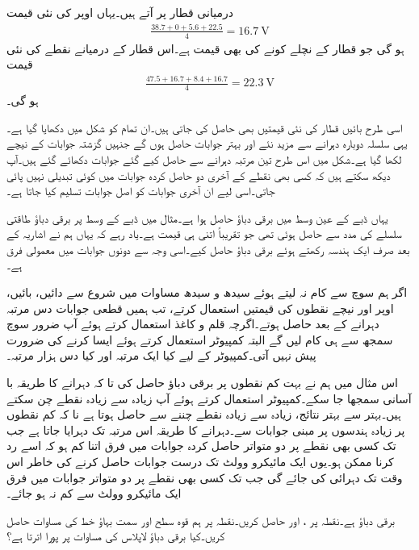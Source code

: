 درمیانی قطار پر آتے ہیں۔یہاں اوپر  کی نئی قیمت
\begin{align*}
\frac{38.7+0+5.6+22.5}{4}=\SI{16.7}{\volt}
\end{align*}
ہو گی جو قطار کے  نچلے کونے کی بھی قیمت ہے۔اس قطار کے درمیانے نقطے کی نئی قیمت
\begin{align*}
\frac{47.5+16.7+8.4+16.7}{4}=\SI{22.3}{\volt}
\end{align*}
ہو گی۔

اسی طرح بائیں قطار  کی نئی قیمتیں بھی حاصل کی جاتی ہیں۔ان تمام کو شکل  میں دکھایا گیا ہے۔یہی سلسلہ دوبارہ دہرانے سے مزید نئے اور بہتر جوابات حاصل ہوں گے جنہیں گزشتہ جوابات کے نیچے لکھا گیا ہے۔شکل میں اس طرح تین مرتبہ دہرانے سے حاصل کیے گئے جوابات دکھائے گئے ہیں۔آپ دیکھ سکتے ہیں کہ کسی بھی نقطے کے آخری دو حاصل کردہ جوابات میں کوئی تبدیلی نہیں پائی جاتی۔اسی لیے ان آخری جوابات کو اصل جوابات تسلیم کیا جاتا ہے۔

یہاں ڈبے کے عین وسط میں برقی دباؤ  حاصل ہوا ہے۔مثال  میں ڈبے کے وسط پر برقی دباؤ طاقتی سلسلے کی مدد سے  حاصل ہوئی تھی جو تقریباً اتنی ہی قیمت ہے۔یاد رہے کہ یہاں ہم نے اشاریہ کے بعد صرف ایک ہندسہ رکھتے ہوئے برقی دباؤ حاصل کیے۔اسی وجہ سے دونوں جوابات میں معمولی فرق ہے۔ 

اگر ہم سوچ سے کام نہ لیتے ہوئے سیدھ و سیدھ مساوات  میں شروع سے دائیں، بائیں، اوپر اور نیچے نقطوں کی قیمتیں استعمال کرتے، تب ہمیں قطعی جوابات دس مرتبہ دہرانے کے بعد حاصل ہوتے۔اگرچہ قلم و کاغذ استعمال کرتے ہوئے آپ ضرور سوچ سمجھ سے ہی کام لیں گے البتہ کمپیوٹر استعمال کرتے ہوئے ایسا کرنے کی ضرورت پیش نہیں آتی۔کمپیوٹر کے لیے کیا ایک مرتبہ اور کیا دس ہزار مرتبہ۔

اس مثال میں ہم نے بہت کم نقطوں پر برقی دباؤ حاصل کی تا کہ دہرانے کا طریقہ با آسانی سمجھا جا سکے۔کمپیوٹر استعمال کرتے ہوئے آپ زیادہ سے زیادہ نقطے چن سکتے ہیں۔بہتر سے بہتر نتائج، زیادہ سے زیادہ نقطے چننے سے حاصل ہوتا ہے نا کہ کم نقطوں پر زیادہ ہندسوں پر مبنی جوابات سے۔دہرانے کا طریقہ اس مرتبہ تک دہرایا جاتا ہے جب تک کسی بھی نقطے پر دو متواتر حاصل کردہ جوابات میں فرق اتنا کم ہو کہ اسے رد کرنا ممکن ہو۔یوں ایک مائیکرو وولٹ تک درست جوابات حاصل کرنے کی خاطر اس وقت تک دہرائی کی جائے گی جب تک کسی بھی نقطے پر دو متواتر جوابات میں فرق ایک مائیکرو وولٹ سے کم نہ ہو جائے۔    

\newpage

برقی دباؤ  ہے۔نقطہ  پر ،  اور  حاصل کریں۔نقطہ  پر ہم قوہ سطح اور سمت بہاؤ خط کی مساوات حاصل کریں۔کیا برقی دباؤ لاپلاس کی مساوات پر پورا اترتا ہے؟

